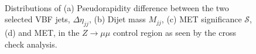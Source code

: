 \begin{figure}[!htb]
\centering
{}
 \\
\caption{Distributions of (a) Pseudorapidity difference between the two selected \gls{VBF} jets, $\Delta\eta_{jj}$, (b) Dijet mass $M_{jj}$, (c) \gls{MET} significance $\mathcal{S}$, (d) and \gls{MET}, in the $Z\rightarrow \mu\mu$ control region as seen by the cross check analysis.}
\label{FIGURE:ParkedDataAnalysis_ZBackground_KeyDistributions}
\end{figure}

